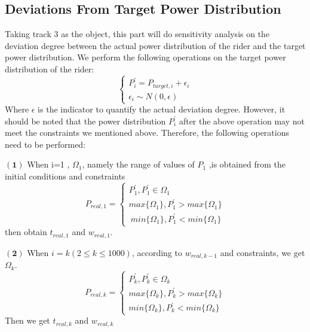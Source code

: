 \documentclass{mcmthesis}
\begin{document}
 \begin{figure}[h]
	\centering
	\caption{}
\end{figure}


\subsection{Deviations From Target Power Distribution}
Taking track 3 as the object, this part will do sensitivity analysis on the deviation degree between the actual power distribution of the rider and the target power distribution. We perform the following operations on the target power distribution of the rider:
\begin{equation}
	\begin{cases}
		P_i^{\prime}=P_{target,i}+\epsilon_i \\
		\epsilon_i \sim N(0,\epsilon) 
	\end{cases}
\end{equation}
Where $\epsilon$ is the indicator to quantify the actual deviation degree. However, it should be noted that the power distribution $P_i^{\prime}$ after the above operation may not meet the constraints we mentioned above. Therefore, the following operations need to be performed:

$\boldsymbol{(1)}$ When i=1 , $\Omega_1$, namely the range of values of $P_1$ ,is obtained from the initial conditions and constraints 
\begin{equation}
	P_{real,1}=\begin{cases}
		P_1^{\prime}, P_1^{\prime}\in \Omega_1\\
		max\{\Omega_1\}, P_1^{\prime}>max\{\Omega_1\}\\\
		min\{\Omega_1\}, P_1^{\prime}<min\{\Omega_1\}
	\end{cases}
\end{equation}
then obtain $t_{real,1}$ and $w_{real,1}$.

$\boldsymbol{(2)}$ When $i=k (2\leq k\leq 1000)$, according to $w_{real,k-1}$ and constraints, we get $\Omega_k$.
\begin{equation}
	P_{real,k}=\begin{cases}
		P_k^{\prime}, P_k^{\prime}\in \Omega_k\\
		max\{\Omega_k\}, P_k^{\prime}>max\{\Omega_k\}\\
		min\{\Omega_k\}, P_k^{\prime}<min\{\Omega_k\}
	\end{cases}
\end{equation}
Then we get $t_{real,k}$ and $w_{real,k}$
\end{document}
